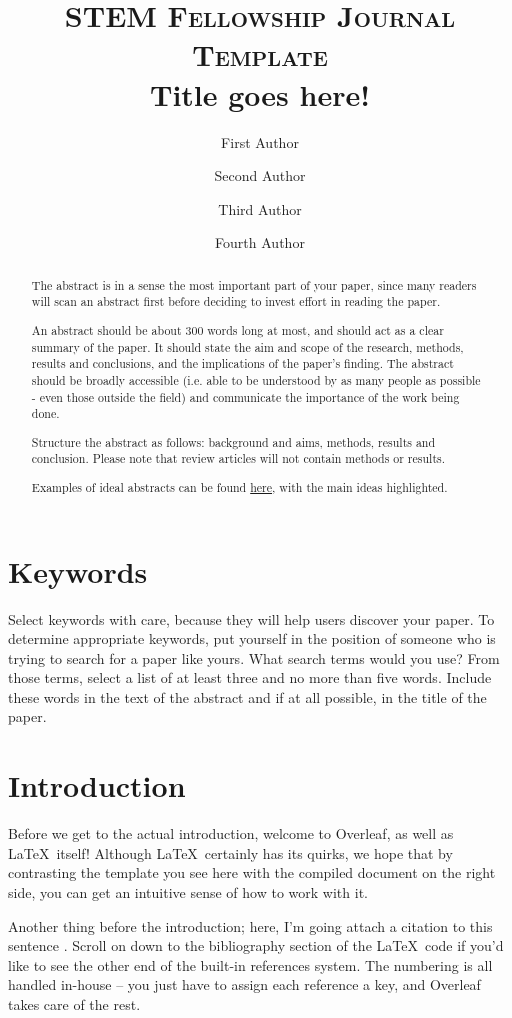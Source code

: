 \documentclass[10pt,twocolumn,letterpaper]{article}
\title{
		\usefont{OT1}{bch}{b}{n}
		\normalfont \normalsize \textsc{STEM Fellowship Journal Template} \\ [14pt]
		\huge Title goes here! \\
}
\author[1]{First Author}
\author[2]{Second Author}
\author[1]{Third Author}
\author[1,3]{Fourth Author}
\affil[1]{\small{Department, Institution/School}}
\affil[2]{Department, Institution/School}
\affil[3]{Department, Institution/School}
\begin{document}
\maketitle

\begin{abstract}
The abstract is in a sense the most important part of your paper, since many readers will scan an abstract first before deciding to invest effort in reading the paper.

An abstract should be about 300 words long at most, and should act as a clear summary of the paper. It should state the aim and scope of the research, methods, results and conclusions, and the implications of the paper’s finding. The abstract should be broadly accessible (i.e. able to be understood by as many people as possible - even those outside the field) and communicate the importance of the work being done. 

Structure the abstract as follows: background and aims, methods, results and conclusion. Please note that review articles will not contain methods or results. 

Examples of ideal abstracts can be found \href{http://journal.stemfellowship.org/userimages/ContentEditor/1451371646443/AbstractExamples.pdf}{here}, with the main ideas highlighted.
\end{abstract} 

\section*{Keywords}
Select keywords with care, because they will help users discover your paper. To determine appropriate keywords, put yourself in the position of someone who is trying to search for a paper like yours. What search terms would you use? From those terms, select a list of at least three and no more than five words. Include these words in the text of the abstract and if at all possible, in the title of the paper.

\section{Introduction}
Before we get to the actual introduction, welcome to Overleaf, as well as \LaTeX\ itself! Although \LaTeX\ certainly has its quirks, we hope that by contrasting the template you see here with the compiled document on the right side, you can get an intuitive sense of how to work with it.

Another thing before the introduction; here, I'm going attach a citation to this sentence \cite{a_reference}. Scroll on down to the bibliography section of the \LaTeX\ code if you'd like to see the other end of the built-in references system. The numbering is all handled in-house -- you just have to assign each reference a key, and Overleaf takes care of the rest.
\end{document}
